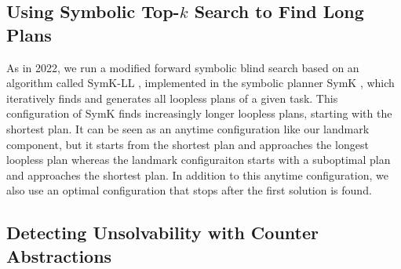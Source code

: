 \documentclass{article}
\renewcommand{\todo}[1]{} %
\begin{document}
\subsection{Using Symbolic Top-$k$ Search to Find Long Plans}

As in 2022, we run a modified forward symbolic blind search \cite{torralba-et-al-aij2017,speck-et-al-icaps2020} based on an algorithm called SymK-LL \cite{vontschammer-et-al-icaps2022}, implemented in the symbolic planner SymK \cite{speck-et-al-aaai2020}, which iteratively finds and generates all loopless plans of a given task. This configuration of SymK finds increasingly longer loopless plans, starting with the shortest plan. It can be seen as an anytime configuration like our landmark component, but it starts from the shortest plan and approaches the longest loopless plan whereas the landmark configuraiton starts with a suboptimal plan and approaches the shortest plan. In addition to this anytime configuration, we also use an optimal configuration that stops after the first solution is found.

\todo{\begin{itemize}
    \item As in 2022, We run a modified forward symbolic blind search \cite{torralba-et-al-aij2017,speck-et-al-icaps2020} based on an algorithm
    called SymK-LL \cite{vontschammer-et-al-icaps2022}, implemented in the symbolic
    planner SymK \cite{speck-et-al-aaai2020}, which iteratively finds and generates
    all loopless plans of a given task.
    \item This configuration of SymK finds increasingly longer loopless plans, starting with the shortest plan. It can be seen as an anytime configuration
    like our landmark component, but it starts from the shortest plan and approaches the longest loopless plan whereas the landmark configuraiton starts with a suboptimal plan and approaches the shortest plan.
    \item In addition to this anytime configuration, we also use an optimal configuration that stops after the first solution.
\end{itemize}}


\subsection{Detecting Unsolvability with Counter Abstractions}
\end{document}
